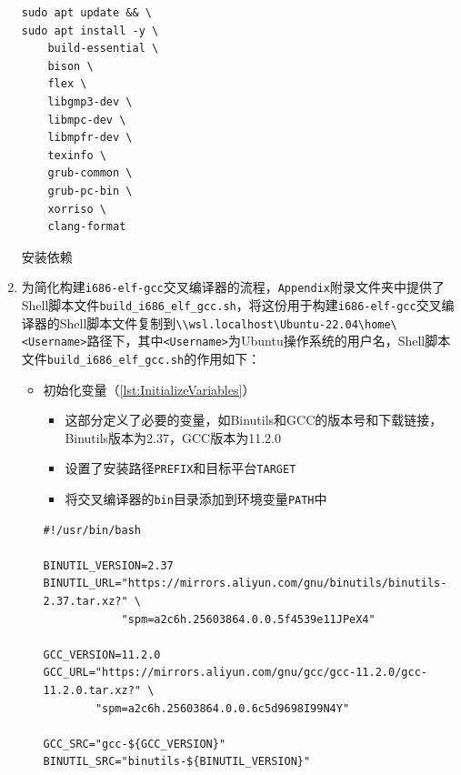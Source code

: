 \begin{enumerate}
          \begin{listing}[htbp]
              \begin{verbatim}
sudo apt update && \
sudo apt install -y \
    build-essential \
    bison \
    flex \
    libgmp3-dev \
    libmpc-dev \
    libmpfr-dev \
    texinfo \
    grub-common \
    grub-pc-bin \
    xorriso \
    clang-format
          \end{verbatim}
              \caption{安装依赖}\label{lst:InstallDependencies}
          \end{listing}
    \item 为简化构建\texttt{i686-elf-gcc}交叉编译器的流程，\texttt{Appendix}附录文件夹中提供了Shell脚本文件\texttt{build\_i686\_elf\_gcc.sh}，将这份用于构建\texttt{i686-elf-gcc}交叉编译器的Shell脚本文件复制到\texttt{\textbackslash\textbackslash wsl.localhost\textbackslash Ubuntu-22.04\textbackslash home\textbackslash <Username>}路径下，其中\texttt{<Username>}为Ubuntu操作系统的用户名，Shell脚本文件\texttt{build\_i686\_elf\_gcc.sh}的作用如下：
          \begin{itemize}
              \item 初始化变量（\cref{lst:InitializeVariables}）
                    \begin{itemize}
                        \item 这部分定义了必要的变量，如Binutils和GCC的版本号和下载链接，Binutils版本为2.37，GCC版本为11.2.0
                        \item 设置了安装路径\texttt{PREFIX}和目标平台\texttt{TARGET}
                        \item 将交叉编译器的\texttt{bin}目录添加到环境变量\texttt{PATH}中
                    \end{itemize}
                    \begin{listing}[htbp]
                        \begin{verbatim}
#!/usr/bin/bash

BINUTIL_VERSION=2.37
BINUTIL_URL="https://mirrors.aliyun.com/gnu/binutils/binutils-2.37.tar.xz?" \
            "spm=a2c6h.25603864.0.0.5f4539e11JPeX4"

GCC_VERSION=11.2.0
GCC_URL="https://mirrors.aliyun.com/gnu/gcc/gcc-11.2.0/gcc-11.2.0.tar.xz?" \
        "spm=a2c6h.25603864.0.0.6c5d9698I99N4Y"

GCC_SRC="gcc-${GCC_VERSION}"
BINUTIL_SRC="binutils-${BINUTIL_VERSION}"


\end{verbatim}
\end{listing}
\end{itemize}
\end{enumerate}
